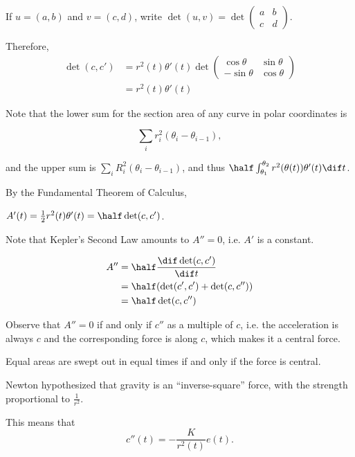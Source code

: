 \documentclass[11pt]{scrartcl}
\begin{document}
If $u = (a, b)$ and $v = (c, d)$, write $\det(u, v) = \det 
\begin{pmatrix}
  a & b \\
  c & d
\end{pmatrix}$.

Therefore,
\begin{align}
  \det(c, c') &= r^2(t)\theta'(t)\det 
  \begin{pmatrix}
    \cos \theta & \sin \theta\\
    -\sin \theta & \cos \theta
  \end{pmatrix}\\
  &= r^2(t) \theta'(t)
\end{align}

Note that the lower sum for the section area of any curve in polar
coordinates is

\[\sum_ir_i^2(\theta_i-\theta_{i-1}),\]

and the upper sum is $\sum_iR_i^2(\theta_i-\theta_{i-1})$, and thus
$\half \int_{\theta_1}^{\theta_2} r^2(\theta(t))\theta'(t)\dif t$.

By the Fundamental Theorem of Calculus,

$A'(t) = \frac{1}{2}r^2(t)\theta'(t) = \half \det(c, c')$.

Note that Kepler's Second Law amounts to $A'' = 0$, i.e. $A'$ is a constant.

\begin{align}
  A'' &= \half  \frac{\dif \det(c, c')}{\dif t}\\
      &= \half(\det(c',c') + \det(c, c''))\\
      &= \half \det(c, c'')
\end{align}

Observe that $A'' = 0$ if and only if $c''$ as a multiple of $c$, i.e. the acceleration is always $c$ and the corresponding force is along $c$, which makes it a central force.

\begin{theorem}
Equal areas are swept out in equal times if and only if the force is central.
\end{theorem}

Newton hypothesized that gravity is an ``inverse-square'' force, with the strength proportional to $\frac{1}{r^2}$.

This means that 
\begin{equation*}
c''(t) = -\frac{K}{r^2(t)}e(t).
\end{equation*}
\end{document}
